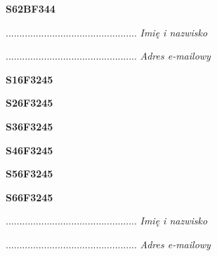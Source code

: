 \begin{turn}{90}\huge \textbf{S62BF344}\end{turn}

\begin{turn}{90}\begin{minipage}{\linewidth} \vspace{20mm} ................................................  \textit{Imię i nazwisko}\end{minipage}\end{turn}

\begin{turn}{90}\begin{minipage}{\linewidth} \vspace{20mm} ................................................  \textit{Adres e-mailowy}\end{minipage}\end{turn}

\begin{turn}{90}\huge \textbf{S16F3245}\end{turn}

\begin{turn}{90}\huge \textbf{S26F3245}\end{turn}

\begin{turn}{90}\huge \textbf{S36F3245}\end{turn}

\begin{turn}{90}\huge \textbf{S46F3245}\end{turn}

\begin{turn}{90}\huge \textbf{S56F3245}\end{turn}

\begin{turn}{90}\huge \textbf{S66F3245}\end{turn}

\begin{turn}{90}\begin{minipage}{\linewidth} \vspace{20mm} ................................................  \textit{Imię i nazwisko}\end{minipage}\end{turn}

\begin{turn}{90}\begin{minipage}{\linewidth} \vspace{20mm} ................................................  \textit{Adres e-mailowy}\end{minipage}\end{turn}

